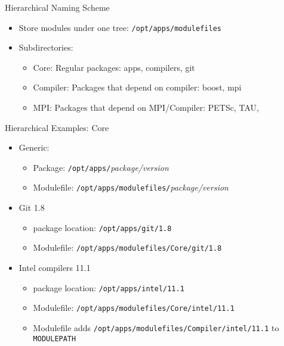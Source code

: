 \documentclass{beamer}
\begin{document}
\begin{frame}{Hierarchical Naming Scheme}
  \begin{itemize}
    \item Store modules under one tree: \texttt{/opt/apps/modulefiles}
    \item Subdirectories:
      \begin{itemize}
        \item Core: Regular packages: apps, compilers, git
        \item Compiler: Packages that depend on compiler: boost, mpi
        \item MPI: Packages that depend on MPI/Compiler: PETSc, TAU, 
      \end{itemize}
  \end{itemize}
\end{frame}

\begin{frame}{Hierarchical Examples: Core}
  \begin{itemize}
    \item Generic:
      \begin{itemize}
        \item Package: \texttt{/opt/apps/}\emph{package/version}
        \item Modulefile: \texttt{/opt/apps/modulefiles/}\emph{package/version}
      \end{itemize}
    \item Git 1.8
      \begin{itemize}
        \item package location: \texttt{/opt/apps/git/1.8}
        \item Modulefile: \texttt{/opt/apps/modulefiles/Core/git/1.8}
      \end{itemize}
    \item Intel compilers 11.1
      \begin{itemize}
        \item package location: \texttt{/opt/apps/intel/11.1}
        \item Modulefile: \texttt{/opt/apps/modulefiles/Core/intel/11.1}
        \item Modulefile adds \texttt{/opt/apps/modulefiles/Compiler/intel/11.1} to \texttt{MODULEPATH}
      \end{itemize}
  \end{itemize}
\end{frame}
\end{document}
